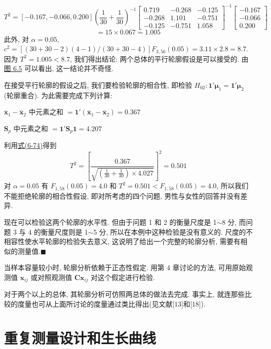 \[
T^2=[-0.167,-0.066,0.200]\left(\frac{1}{30}+\frac{1}{30}\right)^{-1}\begin{bmatrix}0.719&-0.268&-0.125\\-0.268&1.101&-0.751\\-0.125&-0.751&1.058\end{bmatrix}^{-1}\begin{bmatrix}-0.167\\-0.066\\0.200\end{bmatrix}
\]
\[
=15\times0.067=1.005
\]
此外, 对 $\alpha=0.05$, $c^2=[(30+30-2)(4-1)/(30+30-4)]F_{3,56}(0.05)=3.11\times2.8=8.7$. 因为 $T^2=1.005<8.7$, 我们得出结论: 两个总体的平行轮廓假设是可以接受的. 由\hyperref[fig:6.5]{图 6.5} 可以看出, 这一结论并不奇怪.

在接受平行轮廓的假设之后, 我们要检验轮廓的相合性, 即检验 $H_{02}: \mathbf{1}'\boldsymbol{\mu}_1=\mathbf{1}'\boldsymbol{\mu}_2$(轮廓重合). 为此需要完成下列计算:

\noindent $\bar{\mathbf{x}}_1-\bar{\mathbf{x}}_2$ 中元素之和 $=\mathbf{1}'(\bar{\mathbf{x}}_1-\bar{\mathbf{x}}_2)=0.367$

\noindent $\mathbf{S}_p$ 中元素之和 $=\mathbf{1}'\mathbf{S}_p\mathbf{1}=4.207$

利用\hyperref[eq:6-74]{式(6-74)}得到
\[
T^2=\left[\frac{0.367}{\sqrt{\left(\frac{1}{30}+\frac{1}{30}\right)\times4.027}}\right]^2=0.501
\]
对 $\alpha=0.05$ 有 $F_{1,58}(0.05)=4.0$ 和 $T^2=0.501<F_{1,58}(0.05)=4.0$, 所以我们不能拒绝轮廓的相合性假设, 即对所考虑的四个问题, 男性与女性的回答并没有差异.

现在可以检验这两个轮廓的水平性. 但由于问题 1 和 2 的衡量尺度是 1$\sim$8 分, 而问题 3 与 4 的衡量尺度则是 1$\sim$5 分, 所以在本例中这种检验是没有意义的. 尺度的不相容性使水平轮廓的检验失去意义, 这说明了给出一个完整的轮廓分析, 需要有相似的测量值.\hfill$\blacksquare$

当样本容量较小时, 轮廓分析依赖于正态性假定. 用第 4 章讨论的方法, 可用原始观测值 $\mathbf{x}_{ij}$ 或对照观测值 $\mathbf{C}\mathbf{x}_{ij}$ 对这个假定进行检验.

对于两个以上的总体, 其轮廓分析可仿照两总体的做法去完成. 事实上, 就连那些比较的度量也可从上面所讨论的度量通过类比得出(见文献[13]和[18]).

\section{重复测量设计和生长曲线}  %
\label{sec:6.9}

